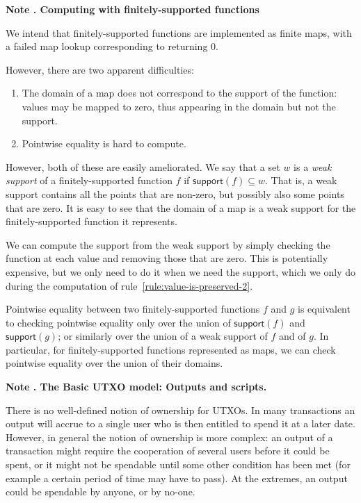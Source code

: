 \documentclass[a4paper]{article}
\newcounter{note}
\newcommand{\note}[1]{
  \bigskip
  \refstepcounter{note}
  \noindent\textbf{Note \thenote. #1}
}
\newcommand{\msf}[1]{\ensuremath{\mathsf{#1}}}
\newcommand{\support}{\msf{support}}
\begin{document}
\note{Computing with finitely-supported functions}
\label{note:finitely-supported-functions}

We intend that finitely-supported functions are implemented as finite
maps, with a failed map lookup corresponding to returning 0.

However, there are two apparent difficulties:
\begin{enumerate}
  \item The domain of a map does not correspond to the support of the function:
    values may be mapped to zero, thus appearing in the domain but not the support.
  \item Pointwise equality is hard to compute.
\end{enumerate}

However, both of these are easily ameliorated. We say that a set $w$ is a \textit{weak support}
of a finitely-supported function $f$ if $\support(f) \subseteq w$. That is, a
weak support contains all the points that are non-zero, but possibly also some
points that are zero. It is easy to see that the domain of a map is a weak
support for the finitely-supported function it represents.

We can compute the support from the weak support by simply checking the function
at each value and removing those that are zero. This is potentially expensive,
but we only need to do it when we need the support, which we only do during the
computation of rule~\ref{rule:value-is-preserved-2}.

Pointwise equality between two finitely-supported functions $f$ and $g$ is
equivalent to checking pointwise equality only over the union of $\support(f)$
and $\support(g)$; or similarly over the union of a weak support of $f$ and of
$g$. In particular, for finitely-supported functions represented as maps, we can
check pointwise equality over the union of their domains.

\note{The Basic UTXO model: Outputs and scripts.}
\label{note:basic-utxo}
There is no well-defined notion of ownership for UTXOs.  In many
transactions an output will accrue to a single user who is then
entitled to spend it at a later date.  However, in general the notion
of ownership is more complex: an output of a transaction might require
the cooperation of several users before it could be spent, or it might
not be spendable until some other condition has been met (for example
a certain period of time may have to pass).  At the extremes, an
output could be spendable by anyone, or by no-one.
\end{document}
